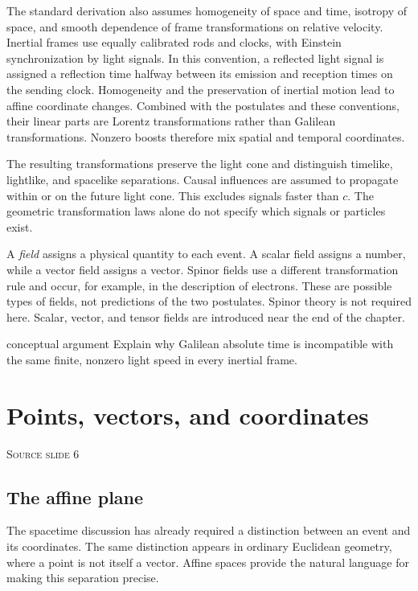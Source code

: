 \documentclass[11pt,a4paper]{article}
\newcommand{\slideref}[1]{%
  \par\smallskip
  {\footnotesize\color{ink!60}\textsc{Source slide #1}}\par
}
\begin{document}
The standard derivation also assumes homogeneity of space and time, isotropy
of space, and smooth dependence of frame transformations on relative
velocity. Inertial frames use equally calibrated rods and clocks, with
Einstein synchronization by light signals. In this convention, a reflected
light signal is assigned a reflection time halfway between its emission and
reception times on the sending clock. Homogeneity and the
preservation of inertial motion lead to affine coordinate changes. Combined
with the postulates and these conventions, their linear parts are Lorentz
transformations rather than Galilean transformations. Nonzero boosts
therefore mix spatial and temporal coordinates.

\begin{precision}
The resulting transformations preserve the light cone and distinguish
timelike, lightlike, and spacelike separations. Causal influences are assumed
to propagate within or on the future light cone. This excludes signals faster
than \(c\). The geometric transformation laws alone do not specify which
signals or particles exist.

A \emph{field} assigns a physical quantity to each event. A scalar field
assigns a number, while a vector field assigns a vector. Spinor fields use a
different transformation rule and occur, for example, in the description of
electrons. These are possible types of fields, not predictions of the two
postulates. Spinor theory is not required here. Scalar, vector, and tensor
fields are introduced near the end of the chapter.
\end{precision}

\begin{studentwork}[height=5.2cm]{conceptual argument}
Explain why Galilean absolute time is incompatible with the same finite,
nonzero light speed in every inertial frame.
\end{studentwork}

\section{Points, vectors, and coordinates}
\slideref{6}

\subsection{The affine plane}

The spacetime discussion has already required a distinction between an event and
its coordinates. The same distinction appears in ordinary Euclidean geometry,
where a point is not itself a vector. Affine spaces provide the natural
language for making this separation precise.
\end{document}
